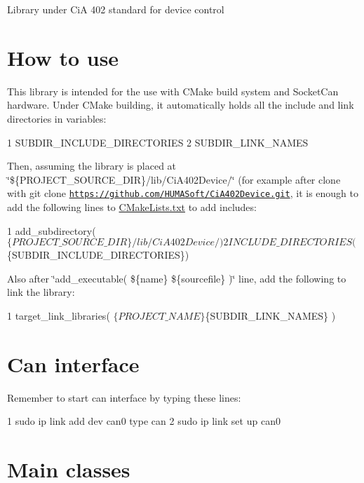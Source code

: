 Library under CiA 402 standard for device control

\section*{How to use}

This library is intended for the use with C\+Make build system and Socket\+Can hardware. Under C\+Make building, it automatically holds all the include and link directories in variables\+:


\begin{DoxyCode}
1 SUBDIR\_INCLUDE\_DIRECTORIES
2 SUBDIR\_LINK\_NAMES
\end{DoxyCode}


Then, assuming the library is placed at \char`\"{}\$\{\+P\+R\+O\+J\+E\+C\+T\+\_\+\+S\+O\+U\+R\+C\+E\+\_\+\+D\+I\+R\}/lib/\+Ci\+A402\+Device/\char`\"{} (for example after clone with {\ttfamily git clone \href{https://github.com/HUMASoft/CiA402Device.git}{\tt https\+://github.\+com/\+H\+U\+M\+A\+Soft/\+Ci\+A402\+Device.\+git}}, it is enough to add the following lines to \hyperlink{CMakeLists_8txt}{C\+Make\+Lists.\+txt} to add includes\+:


\begin{DoxyCode}
1 add\_subdirectory($\{PROJECT\_SOURCE\_DIR\}/lib/CiA402Device/)
2 INCLUDE\_DIRECTORIES($\{SUBDIR\_INCLUDE\_DIRECTORIES\})
\end{DoxyCode}


Also after \char`\"{}add\+\_\+executable( \$\{name\} \$\{sourcefile\} )\char`\"{} line, add the following to link the library\+:


\begin{DoxyCode}
1 target\_link\_libraries( $\{PROJECT\_NAME\} $\{SUBDIR\_LINK\_NAMES\} )
\end{DoxyCode}


\section*{Can interface}

Remember to start can interface by typing these lines\+:


\begin{DoxyCode}
1 sudo ip link add dev can0 type can
2 sudo ip link set up can0
\end{DoxyCode}


\section*{Main classes}

